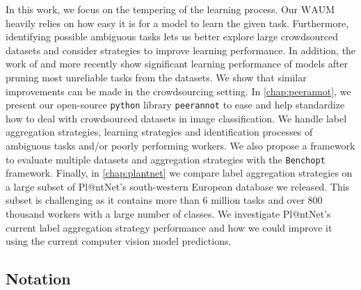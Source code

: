 In this work, we focus on the tempering of the learning process.
Our $\mathrm{WAUM}$ heavily relies on how easy it is for a model to learn the given task.
Furthermore, identifying possible ambiguous tasks lets us better explore large crowdsourced datasets and consider strategies to improve learning performance.
In addition, the work of \citet{merler2004bias} and more recently \citet{pleiss_identifying_2020} show significant learning performance of models after pruning most unreliable tasks from the datasets.
We show that similar improvements can be made in the crowdsourcing setting.
In \cref{chap:peerannot}, we present our open-source \texttt{python} library \texttt{peerannot} to ease and help standardize how to deal with crowdsourced datasets in image classification.
We handle label aggregation strategies, learning strategies and identification processes of ambiguous tasks and/or poorly performing workers.
We also propose a framework to evaluate multiple datasets and aggregation strategies with the \texttt{Benchopt} framework.
Finally, in \cref{chap:plantnet} we compare label aggregation strategies on a large subset of Pl@ntNet's south-western European database we released.
This subset is challenging as it contains more than $6$ million tasks and over $800$ thousand workers with a large number of classes.
We investigate Pl@ntNet's current label aggregation strategy performance and how we could improve it using the current computer vision model predictions.

\subsection{Notation}

